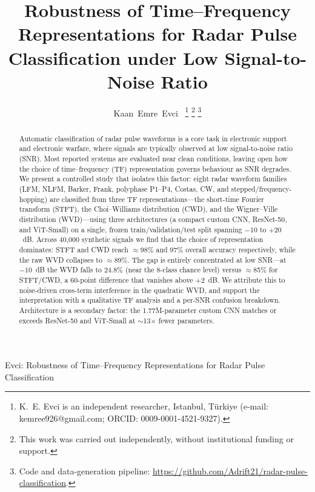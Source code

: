 \documentclass[journal]{IEEEtran}
\begin{document}
\title{Robustness of Time--Frequency Representations for Radar Pulse
Classification under Low Signal-to-Noise Ratio}

\author{Kaan~Emre~Evci~%
\thanks{K.~E. Evci is an independent researcher, Istanbul, T\"urkiye
(e-mail: kemree926@gmail.com; ORCID: 0009-0001-4521-9327).}
\thanks{This work was carried out independently, without institutional funding or
support.}
\thanks{Code and data-generation pipeline:
\url{https://github.com/Adrift21/radar-pulse-classification}.}}

%
{Evci: Robustness of Time--Frequency Representations for Radar Pulse Classification}

\maketitle

\begin{abstract}
Automatic classification of radar pulse waveforms is a core task in electronic
support and electronic warfare, where signals are typically observed at low
signal-to-noise ratio (SNR). Most reported systems are evaluated near clean
conditions, leaving open how the choice of time--frequency (TF) representation
governs behaviour as SNR degrades. We present a controlled study that isolates
this factor: eight radar waveform families (LFM, NLFM, Barker, Frank, polyphase
P1--P4, Costas, CW, and stepped/frequency-hopping) are classified from three TF
representations---the short-time Fourier transform (STFT), the Choi--Williams
distribution (CWD), and the Wigner--Ville distribution (WVD)---using three
architectures (a compact custom CNN, ResNet-50, and ViT-Small) on a single,
frozen train/validation/test split spanning $-10$ to $+20$~dB. Across 40{,}000
synthetic signals we find that the choice of representation dominates: STFT and
CWD reach $\approx$98\% and 97\% overall accuracy respectively, while the raw WVD
collapses to $\approx$89\%. The gap is entirely concentrated at low SNR---at
$-10$~dB the WVD falls to $24.8\%$ (near the 8-class chance level) versus
$\approx$85\% for STFT/CWD, a 60-point difference that vanishes above $+2$~dB. We
attribute this to noise-driven cross-term interference in the quadratic WVD, and
support the interpretation with a qualitative TF analysis and a per-SNR confusion
breakdown. Architecture is a secondary factor: the 1.77M-parameter custom CNN
matches or exceeds ResNet-50 and ViT-Small at $\sim$13$\times$ fewer parameters.
\end{abstract}
\end{document}
